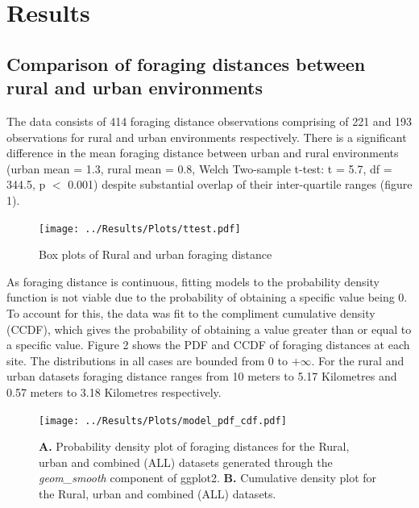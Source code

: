 \documentclass[11pt]{article}
\begin{document}
\section{Results}
\begin{linenumbers}

\subsection{Comparison of foraging distances between rural and urban environments}
The data consists of 414 foraging distance observations comprising of 221 and 193 observations for rural and urban environments respectively. There is a significant difference in the mean foraging distance between urban and rural environments (urban mean = 1.3, rural mean = 0.8, Welch Two-sample t-test: t = 5.7, df = 344.5, p $<$ 0.001) despite substantial overlap of their inter-quartile ranges (figure 1).\\ \par

\begin{figure}[H]
	\centering
	\texttt{[image: ../Results/Plots/ttest.pdf]}
	\caption{Box plots of Rural and urban foraging distance}
\end{figure}
	
As foraging distance is continuous, fitting models to the probability density function is not viable due to the probability of obtaining a specific value being 0. To account for this, the data was fit to the compliment cumulative density (CCDF), which gives the probability of obtaining a value greater than or equal to a specific value. Figure 2 shows the PDF and CCDF of foraging distances at each site. The distributions in all cases are bounded from 0 to $+\infty$. For the rural and urban datasets foraging distance ranges from 10 meters to 5.17 Kilometres and 0.57 meters to 3.18 Kilometres respectively.\\\par

\begin{figure}[H]
	\centering
	\texttt{[image: ../Results/Plots/model\_pdf\_cdf.pdf]}
	\caption{\textbf{A.} Probability density plot of foraging distances for the Rural, urban and combined (ALL) datasets generated through the \textit{geom\_smooth} component of ggplot2. \textbf{B.} Cumulative density plot for the Rural, urban and combined (ALL) datasets.}
\end{figure}


\end{linenumbers}
\end{document}
